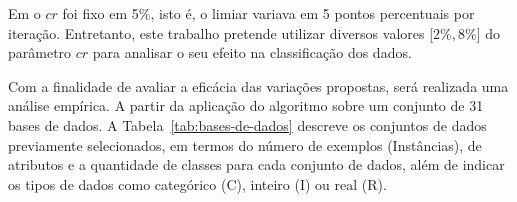    Em  o $cr$ foi fixo em 5\%, isto é, o limiar variava em 5 pontos percentuais por iteração. Entretanto, este trabalho pretende utilizar diversos valores [$2\%, 8\%$] do parâmetro $cr$ para analisar o seu efeito na classificação dos dados.
    
    
   
    
    
    Com a finalidade de avaliar a eficácia das variações propostas, será realizada uma análise empírica. A partir da aplicação do algoritmo sobre um conjunto de 31 bases de dados. A Tabela~\ref{tab:bases-de-dados} descreve os conjuntos de dados previamente selecionados, em termos do número de exemplos (Instâncias), de atributos e a quantidade de classes para cada conjunto de dados, além de indicar os tipos de dados como categórico (C), inteiro (I) ou real (R).
    
